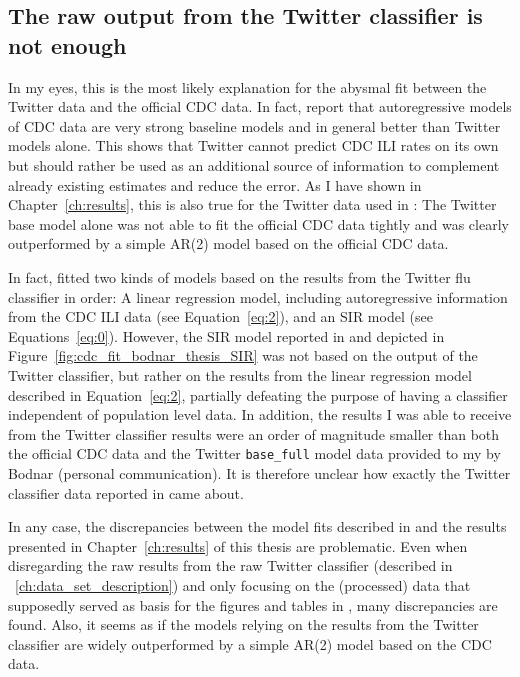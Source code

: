 \documentclass[11pt, a4paper,twoside]{report}\usepackage[]{graphicx}\usepackage[]{color}
\begin{document}
\subsection{The raw output from the Twitter classifier is not enough}
In my eyes, this is the most likely explanation for the abysmal fit between the Twitter data and the official CDC data. In fact, \cite{paul_worldwide_2015} report that autoregressive models of CDC data are very strong baseline models and in general better than Twitter models alone. This shows that Twitter cannot predict CDC ILI rates on its own but should rather be used as an additional source of information to complement already existing estimates and reduce the error. As I have shown in Chapter~\ref{ch:results}, this is also true for the Twitter data used in \cite{bodnar_data_2015}: The Twitter base model alone was not able to fit the official CDC data tightly and was clearly outperformed by a simple AR(2) model based on the official CDC data. 

In fact, \cite{bodnar_data_2015} fitted two kinds of models based on the results from the Twitter flu classifier in order: A linear regression model, including autoregressive information from the CDC ILI data (see Equation~\ref{eq:2}), and an SIR model (see Equations~\ref{eq:0}). However, the SIR model reported in \cite{bodnar_data_2015} and depicted in Figure~\ref{fig:cdc_fit_bodnar_thesis_SIR} was not based on the output of the Twitter classifier, but rather on the results from the linear regression model described in Equation~\ref{eq:2}, partially defeating the purpose of having a classifier independent of population level data. In addition, the results I was able to receive from the Twitter classifier results were an order of magnitude smaller than both the official CDC data and the Twitter \texttt{base\_full} model data provided to my by Bodnar (personal communication). It is therefore unclear how exactly the Twitter classifier data reported in \cite{bodnar_data_2015} came about. 

In any case, the discrepancies between the model fits described in \cite{bodnar_data_2015} and the results presented in Chapter~\ref{ch:results} of this thesis are problematic. Even when disregarding the raw results from the raw Twitter classifier (described in ~\ref{ch:data_set_description}) and only focusing on the (processed) data that supposedly served as basis for the figures and tables in \cite{bodnar_data_2015}, many discrepancies are found. Also, it seems as if the models relying on the results from the Twitter classifier are widely outperformed by a simple AR(2) model based on the CDC data.
\end{document}
